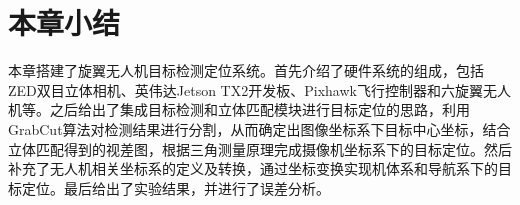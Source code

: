 
\section{本章小结}
本章搭建了旋翼无人机目标检测定位系统。首先介绍了硬件系统的组成，包括ZED双目立体相机、英伟达Jetson TX2开发板、Pixhawk飞行控制器和六旋翼无人机等。之后给出了集成目标检测和立体匹配模块进行目标定位的思路，利用GrabCut算法对检测结果进行分割，从而确定出图像坐标系下目标中心坐标，结合立体匹配得到的视差图，根据三角测量原理完成摄像机坐标系下的目标定位。然后补充了无人机相关坐标系的定义及转换，通过坐标变换实现机体系和导航系下的目标定位。最后给出了实验结果，并进行了误差分析。






